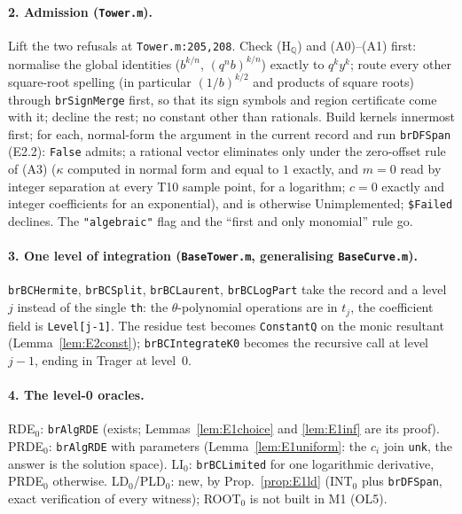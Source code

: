 \documentclass[11pt]{article}
\theoremstyle{definition}
\theoremstyle{remark}
\newcommand{\Q}{\mathbb{Q}}
\newcommand{\code}[1]{\texttt{#1}}
\begin{document}
\paragraph{2. Admission (\code{Tower.m}).} Lift the two refusals at \code{Tower.m:205,208}.
Check (H$_\Q$) and (A0)--(A1) first: normalise the global identities ($b^{k/n}$, $(q^nb)^{k/n}$)
exactly to $q^ky^k$; route every other square-root spelling (in particular $(1/b)^{k/2}$ and
products of square roots) through \code{brSignMerge} first, so that its sign symbols and region
certificate come with it; decline the rest; no constant other than rationals. Build kernels innermost first; for each, normal-form the argument
in the current record and run \code{brDFSpan} (E2.2): \code{False} admits; a rational vector
eliminates only under the zero-offset rule of (A3) ($\kappa$ computed in normal form and
equal to $1$ exactly, and $m=0$ read by integer separation at every T10 sample point, for a
logarithm; $c=0$ exactly and integer coefficients for an exponential), and is otherwise
Unimplemented; \code{\$Failed} declines. The \code{"algebraic"} flag and the ``first and only
monomial'' rule go.

\paragraph{3. One level of integration (\code{BaseTower.m}, generalising \code{BaseCurve.m}).}
\code{brBCHermite}, \code{brBCSplit}, \code{brBCLaurent}, \code{brBCLogPart} take the record
and a level $j$ instead of the single \code{th}: the $\theta$-polynomial operations are in
$t_j$, the coefficient field is \code{Level[j-1]}. The residue test becomes
\code{ConstantQ} on the monic resultant (Lemma~\ref{lem:E2const}); \code{brBCIntegrateK0}
becomes the recursive call at level $j-1$, ending in Trager at level~0.

\paragraph{4. The level-0 oracles.} RDE$_0$: \code{brAlgRDE} (exists; Lemmas~\ref{lem:E1choice}
and \ref{lem:E1inf} are its proof). PRDE$_0$: \code{brAlgRDE} with parameters
(Lemma~\ref{lem:E1uniform}: the $c_i$ join \code{unk}, the answer is the solution space). LI$_0$:
\code{brBCLimited} for one logarithmic derivative, PRDE$_0$ otherwise. LD$_0$/PLD$_0$: new, by
Prop.~\ref{prop:E1ld} (INT$_0$ plus \code{brDFSpan}, exact verification of every witness);
ROOT$_0$ is not built in M1 (OL5).
\end{document}
